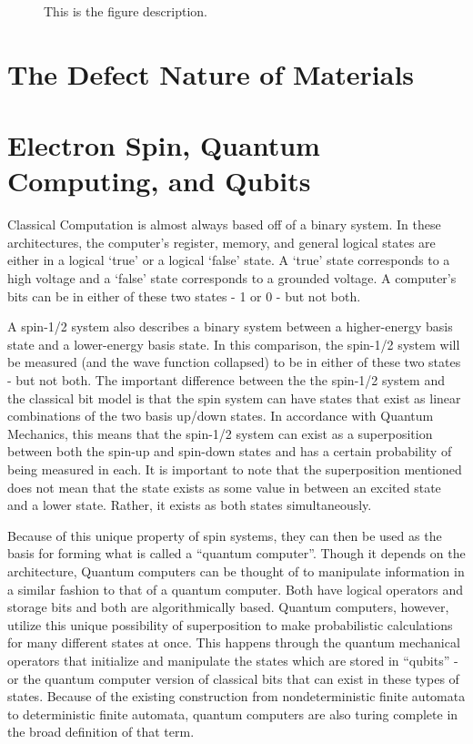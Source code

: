 \documentclass[oneside, astronomy, noacknowlegments]{BYUPhys}
\begin{document}
\begin{figure}
    \caption[Zeeman effect and resonant conditions in matter]{\label{fig:Zeeman}
     This is the figure description.}
\end{figure}

\section{The Defect Nature of Materials}
\label{sec:Defects}

\section{Electron Spin, Quantum Computing, and Qubits}
\label{sec:QuantumComputers}

Classical Computation is almost always based off of a binary system. In these architectures, the computer’s register, memory, and general logical states are either in a logical ‘true’ or a logical ‘false’ state. A ‘true’ state corresponds to a high voltage and a ‘false’ state corresponds to a grounded voltage. A computer’s bits can be in either of these two states - 1 or 0 - but not both.

A spin-1/2 system also describes a binary system between a higher-energy basis state and a lower-energy basis state. In this comparison, the spin-1/2 system will be measured (and the wave function collapsed) to be in either of these two states - but not both. The important difference between the the spin-1/2 system and the classical bit model is that the spin system can have states that exist as linear combinations of the two basis up/down states. In accordance with Quantum Mechanics, this means that the spin-1/2 system can exist as a superposition between both the spin-up and spin-down states and has a certain probability of being measured in each. It is important to note that the superposition mentioned does not mean that the state exists as some value in between an excited state and a lower state. Rather, it exists as both states simultaneously.

Because of this unique property of spin systems, they can then be used as the basis for forming what is called a “quantum computer”. Though it depends on the architecture, Quantum computers can be thought of to manipulate information in a similar fashion to that of a quantum computer. Both have logical operators and storage bits and both are algorithmically based. Quantum computers, however, utilize this unique possibility of superposition to make probabilistic calculations for many different states at once. This happens through the quantum mechanical operators that initialize and manipulate the states which are stored in “qubits” - or the quantum computer version of classical bits that can exist in these types of states. Because of the existing construction from nondeterministic finite automata to deterministic finite automata, quantum computers are also turing complete in the broad definition of that term.
\end{document}
